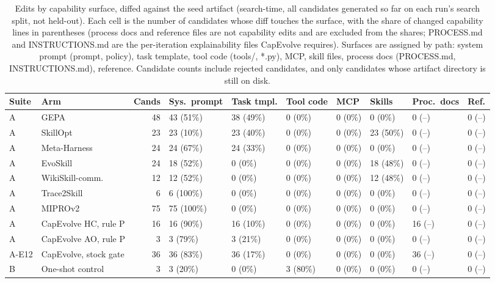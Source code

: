 \begin{table}[t]
\centering
\scriptsize
\caption{Edits by capability surface, diffed against the seed artifact (search-time, all candidates generated so far on each run's search split, not held-out). Each cell is the number of candidates whose diff touches the surface, with the share of changed capability lines in parentheses (process docs and reference files are not capability edits and are excluded from the shares; PROCESS.md and INSTRUCTIONS.md are the per-iteration explainability files CapEvolve requires). Surfaces are assigned by path: system prompt (prompt, policy), task template, tool code (tools/, *.py), MCP, skill files, process docs (PROCESS.md, INSTRUCTIONS.md), reference. Candidate counts include rejected candidates, and only candidates whose artifact directory is still on disk.}
\label{tab:searchtime-edits}
\begin{tabular}{@{}llrlllllll@{}}
\toprule
Suite & Arm & Cands & Sys.\ prompt & Task tmpl. & Tool code & MCP & Skills & Proc.\ docs & Ref. \\
\midrule
A & GEPA & 48 & 43 (51\%) & 38 (49\%) & 0 (0\%) & 0 (0\%) & 0 (0\%) & 0 (--) & 0 (--) \\
A & SkillOpt & 23 & 23 (10\%) & 23 (40\%) & 0 (0\%) & 0 (0\%) & 23 (50\%) & 0 (--) & 0 (--) \\
A & Meta-Harness & 24 & 24 (67\%) & 24 (33\%) & 0 (0\%) & 0 (0\%) & 0 (0\%) & 0 (--) & 0 (--) \\
A & EvoSkill & 24 & 18 (52\%) & 0 (0\%) & 0 (0\%) & 0 (0\%) & 18 (48\%) & 0 (--) & 0 (--) \\
A & WikiSkill-comm. & 12 & 12 (52\%) & 0 (0\%) & 0 (0\%) & 0 (0\%) & 12 (48\%) & 0 (--) & 0 (--) \\
A & Trace2Skill & 6 & 6 (100\%) & 0 (0\%) & 0 (0\%) & 0 (0\%) & 0 (0\%) & 0 (--) & 0 (--) \\
A & MIPROv2 & 75 & 75 (100\%) & 0 (0\%) & 0 (0\%) & 0 (0\%) & 0 (0\%) & 0 (--) & 0 (--) \\
A & CapEvolve HC, rule P & 16 & 16 (90\%) & 16 (10\%) & 0 (0\%) & 0 (0\%) & 0 (0\%) & 16 (--) & 0 (--) \\
A & CapEvolve AO, rule P & 3 & 3 (79\%) & 3 (21\%) & 0 (0\%) & 0 (0\%) & 0 (0\%) & 0 (--) & 0 (--) \\
A-E12 & CapEvolve, stock gate & 36 & 36 (83\%) & 36 (17\%) & 0 (0\%) & 0 (0\%) & 0 (0\%) & 36 (--) & 0 (--) \\
B & One-shot control & 3 & 3 (20\%) & 0 (0\%) & 3 (80\%) & 0 (0\%) & 0 (0\%) & 0 (--) & 0 (--) \\

\end{tabular}
\end{table}
